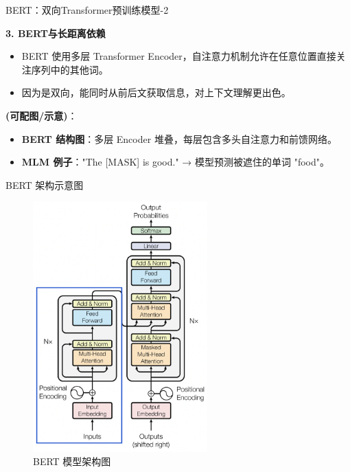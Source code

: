 \documentclass{beamer}
\begin{document}
  \begin{frame}{BERT：双向Transformer预训练模型-2}

  \textbf{3. BERT与长距离依赖}
  \begin{itemize}
    \item BERT 使用多层 Transformer Encoder，自注意力机制允许在任意位置直接关注序列中的其他词。
    \item 因为是双向，能同时从前后文获取信息，对上下文理解更出色。
  \end{itemize}
  \vspace{1em}

  \textbf{(可配图/示意)}：
  \begin{itemize}
    \item \textbf{BERT 结构图}：多层 Encoder 堆叠，每层包含多头自注意力和前馈网络。
    \item \textbf{MLM 例子}："The [MASK] is good." → 模型预测被遮住的单词 "food"。
  \end{itemize}

\end{frame}
\begin{frame}{BERT 架构示意图}
  \begin{figure}
    \centering
    \includegraphics[width=0.6\textwidth, height=0.6\textheight]{BERT4.png}
    \caption{BERT 模型架构图}
  \end{figure}
  
\end{frame}
\end{document}
